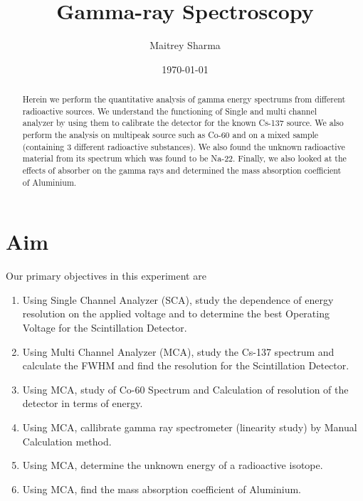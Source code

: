 \documentclass[%
 reprint,
nofootinbib,
 amsmath,amssymb,
 aps,
floatfix,
]{revtex4-2}
\begin{document}

\title{Gamma-ray Spectroscopy}%


\author{Maitrey Sharma}




\date{\today}%

\begin{abstract}
    Herein we perform the quantitative analysis of gamma energy spectrums from different radioactive sources. We understand the functioning of Single and multi channel analyzer by using them to calibrate the detector for the known Cs-137 source. We also perform the analysis on multipeak source such as Co-60 and on a mixed sample (containing 3 different radioactive substances). We also found the unknown radioactive material from its spectrum which was found to be Na-22. Finally, we also looked at the effects of absorber on the gamma rays and determined the mass absorption coefficient of Aluminium.
\end{abstract}

\keywords{}
\maketitle



    
\section{Aim}
    Our primary objectives in this experiment are
    \begin{enumerate}
        \item Using Single Channel Analyzer (SCA), study the dependence of energy resolution on the applied voltage and to determine the best Operating Voltage for the Scintillation Detector.
        \item Using Multi Channel Analyzer (MCA), study the Cs-137 spectrum and calculate the FWHM and find the resolution for the Scintillation Detector.
        \item Using MCA, study of Co-60 Spectrum and Calculation of resolution of the detector in terms of energy.
        \item Using MCA, callibrate gamma ray spectrometer (linearity study) by Manual Calculation method.
        \item Using MCA, determine the unknown energy of a radioactive isotope.
        \item Using MCA, find the mass absorption coefficient of Aluminium.
    \end{enumerate}
    
\end{document}
